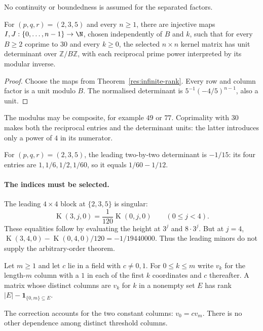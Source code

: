 \documentclass[11pt]{article}
\newcommand{\Kernel}{\operatorname{K}}
\begin{document}
No continuity or boundedness is assumed for the separated factors.

\begin{corollary}
\label{res:admissible-modular-minors}
For $(p,q,r)=(2,3,5)$ and every $n\ge1$, there are injective maps
$I,J:\{0,\ldots,n-1\}\to\N$, chosen independently of $B$ and $k$, such that
for every $B\ge2$ coprime to $30$ and every $k\ge0$, the selected $n\times n$
kernel matrix has unit determinant over $\mathbb Z/B\mathbb Z$, with each
reciprocal prime power interpreted by its modular inverse.
\end{corollary}
\begin{proof}
Choose the maps from Theorem~\ref{res:infinite-rank}.  Every row and column
factor is a unit modulo $B$.  The normalised determinant is
$5^{-1}(-4/5)^{n-1}$, also a unit.
\end{proof}
The modulus may be composite, for example $49$ or $77$.  Coprimality
with $30$ makes both the reciprocal entries and the determinant units:
the latter introduces only a power of $4$ in its numerator.


\begin{example}\label{res:rank}
For $(p,q,r)=(2,3,5)$, the leading two-by-two determinant is $-1/15$:
its four entries are $1,1/6,1/2,1/60$, so it equals $1/60-1/12$.
\end{example}


\paragraph{The indices must be selected.}
The leading $4\times4$ block at $\{2,3,5\}$ is singular:
\[
 \Kernel(3,j,0)=\frac1{120}\Kernel(0,j,0)\qquad(0\le j<4).
\]
These equalities follow by evaluating the height at $3^j$ and $8\cdot3^j$.
But at $j=4$,
$\Kernel(3,4,0)-\Kernel(0,4,0)/120=-1/19440000$.
Thus the leading minors do not supply the arbitrary-order theorem.


\begin{proposition}\label{res:finite-cut-rank}
Let $m\ge1$ and let $c$ lie in a field with $c\ne 0,1$.
For $0\le k\le m$ write $v_k$ for the length-$m$ column with a $1$ in each of
the first $k$ coordinates and $c$ thereafter.
A matrix whose distinct columns are $v_k$ for $k$ in a nonempty set $E$ has
rank $|E|-\mathbf 1_{\{0,m\}\subseteq E}$.
\end{proposition}

The correction accounts for the two constant columns: $v_0=c v_m$.
There is no other dependence among distinct threshold columns.
\end{document}
